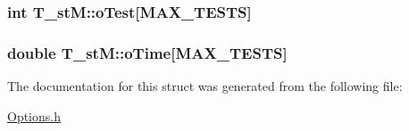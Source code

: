 \hypertarget{structT__stM_a96a05b3681ffbe7e0f1a8ee95b74fa3a}{
\subsubsection[{o\-Test}]{\setlength{\rightskip}{0pt plus 5cm}int T\-\_\-st\-M\-::o\-Test\mbox{[}{\bf M\-A\-X\-\_\-\-T\-E\-S\-T\-S}\mbox{]}}}\label{structT__stM_a96a05b3681ffbe7e0f1a8ee95b74fa3a}
\hypertarget{structT__stM_a3b6e012242e88dd2c27e90bea06c3ef5}{
\subsubsection[{o\-Time}]{\setlength{\rightskip}{0pt plus 5cm}double T\-\_\-st\-M\-::o\-Time\mbox{[}{\bf M\-A\-X\-\_\-\-T\-E\-S\-T\-S}\mbox{]}}}\label{structT__stM_a3b6e012242e88dd2c27e90bea06c3ef5}


The documentation for this struct was generated from the following file\-:\begin{DoxyCompactItemize}
\item 
\hyperlink{Options_8h}{Options.\-h}\end{DoxyCompactItemize}
